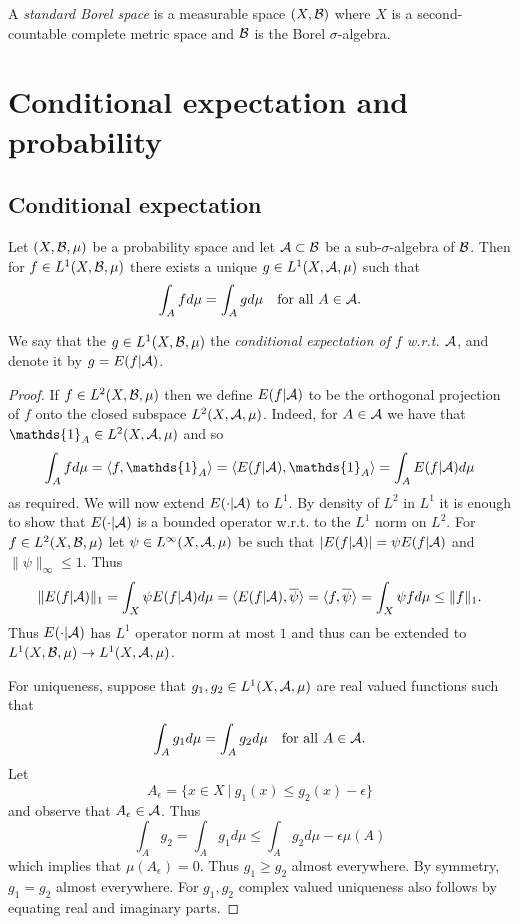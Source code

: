 \documentclass[twoside, a4paper, 10pt]{amsart}
\begin{document}
\begin{mydef} A \textit{standard Borel space} is a measurable space $(X,\mathcal{B})$ where $X$ is a second-countable complete metric space and $\mathcal{B}$ is the Borel $\sigma$-algebra.

\end{mydef}

\section{Conditional expectation and probability}

\subsection{Conditional expectation}

\begin{thm} Let $(X, \mathcal{B}, \mu)$ be a probability space and let $\mathcal{A} \subset \mathcal{B}$ be a sub-$\sigma$-algebra of $\mathcal{B}$. Then for $f \in L^1(X,\mathcal{B},\mu)$ there exists a unique $g \in L^1(X,\mathcal{A},\mu)$ such that $$\int_A f d\mu = \int_A g d\mu \quad\text{for all } A\in \mathcal{A}.$$

\end{thm}

\begin{mydef} We say that the $g \in L^1(X,\mathcal{B},\mu)$ the \textit{conditional expectation of $f$ w.r.t. $\mathcal{A}$}, and denote it by $g = E(f|\mathcal{A})$.

\end{mydef}

\begin{proof} If $f \in L^2(X,\mathcal{B},\mu)$ then we define $E(f|\mathcal{A})$ to be the orthogonal projection of $f$ onto the closed subspace $L^2(X,\mathcal{A},\mu)$. Indeed, for $A \in \mathcal{A}$ we have that $\mathds{1}_A \in L^2(X, \cA,\mu)$ and so $$\int_A f d\mu = \langle f, \mathds{1}_A \rangle = \langle E(f|\cA), \mathds{1}_A \rangle = \int_A  E(f|\cA) d\mu$$ as required. 
We will now extend $E(\cdot |\mathcal{A})$ to $L^1$. By density of $L^2$ in $L^1$ it is enough to show that $E(\cdot |\mathcal{A})$ is a bounded operator w.r.t. to the $L^1$ norm on $L^2$. For $f \in L^2(X,\mathcal{B},\mu)$ let $\psi \in L^{\infty}(X,\mathcal{A},\mu)$ be such that $|E(f|\mathcal{A})| = \psi E(f|\mathcal{A})$ and $\|\psi\|_{\infty} \leq 1$.
Thus $$\|E(f|\mathcal{A})\|_{1} = \int_X \psi E(f|\mathcal{A}) d\mu = \langle E(f|\mathcal{A}), \overline{\psi} \rangle = \langle f, \overline{\psi} \rangle = \int_X \psi f d\mu \leq \|f\|_1.$$ Thus $E(\cdot |\mathcal{A})$ has $L^1$ operator norm at most $1$ and thus can be extended to $L^1(X,\mathcal{B},\mu) \to L^1(X,\mathcal{A},\mu)$.

For uniqueness, suppose that $g_1,g_2 \in L^1(X,\mathcal{A},\mu)$ are real valued functions such that $$\int_A g_1 d\mu = \int_A g_2 d\mu \quad \text{for all } A \in \mathcal{A}.$$ Let $$A_{\epsilon} = \{x \in X ~|~ g_1(x) \leq g_2(x) - \epsilon \}$$ and observe that $A_{\epsilon} \in \mathcal{A}$. Thus $$\int_A g_2 = \int_A g_1 d\mu \leq \int_A g_2 d\mu - \epsilon \mu(A)$$ which implies that $\mu(A_{\epsilon}) = 0$. Thus $g_1 \geq g_2$ almost everywhere. By symmetry, $g_1=g_2$ almost everywhere. For $g_1,g_2$ complex valued uniqueness also follows by equating real and imaginary parts. 
\end{proof}
\end{document}
